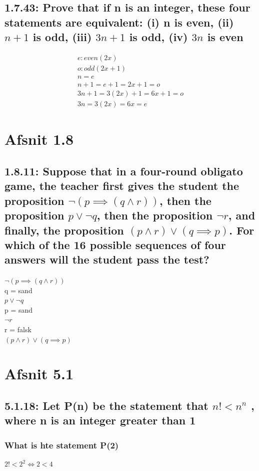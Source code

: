 \documentclass[12pt, a4paper]{report}
\begin{document}
			\subsection{1.7.43: Prove that if n is an integer, these four statements are equivalent: (i) n is even, (ii) $n + 1$ is odd, (iii) $3n + 1$ is odd, (iv) $3n$ is even}
				\begin{align*}
					e: even(2x)\\
					o: odd(2x+1)\\
					n = e\\
					n+1=e+1=2x+1=o\\
					3n+1=3(2x)+1=6x+1=o\\
					3n=3(2x)=6x=e
				\end{align*}
		\section{Afsnit 1.8}
			\setcounter{subsection}{10}
			\subsection{1.8.11: Suppose that in a four-round obligato game, the teacher ﬁrst gives the student the proposition $\neg(p \implies (q \land r))$, then the proposition $p \lor\neg q$, then the proposition $\neg r$, and ﬁnally, the proposition $(p \land r) \lor (q \implies p)$. For which of the 16 possible sequences of four answers will the student pass the test?}
			$\neg(p\implies (q\land r))$\\
			q = sand\\
			$p\lor\neg q$\\
			p = sand\\
			$\neg r$\\
			r = falsk\\
			$(p\land r)\lor(q\implies p)$\\
		\section{Afsnit 5.1}
			\setcounter{subsection}{17}
			\subsection{5.1.18: Let P(n) be the statement that $n! < n^n$ , where n is an integer greater than 1}
				\subsubsection{What is hte statement P(2)}
				$2!<2^2\iff 2<4$
\end{document}
